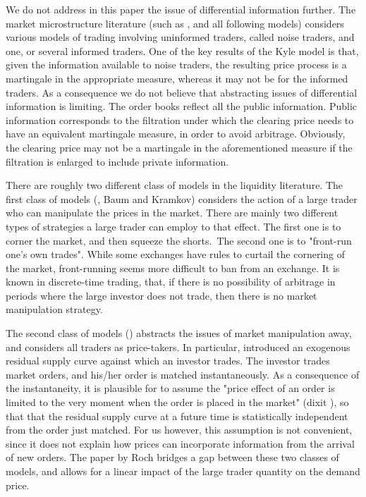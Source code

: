 \documentclass{article}
\begin{document}
We do not address in this paper the issue of differential information
further. The market microstructure literature (such as \cite{Kyl85}, and all
following models) considers various models of trading involving uninformed
traders, called noise traders, and one, or several informed traders. One of
the key results of the Kyle model is that, given the information available
to noise traders, the resulting price process is a martingale in the
appropriate measure, whereas it may not be for the informed traders. As a
consequence we do not believe that abstracting issues of differential
information is limiting. The order books reflect all the public information.
Public information corresponds to the filtration under which the clearing
price needs to have an equivalent martingale measure, in order to avoid
arbitrage. Obviously, the clearing price may not be a martingale in the
aforementioned measure if the filtration is enlarged to include private
information.

There are roughly two different class of models in the liquidity literature.
The first class of models (\cite{Jar92, Jar94, PS98a, PS98b, Fre98, SW00,
BB04, RS10}, Baum and Kramkov) considers the action of a large trader who
can manipulate the prices in the market. There are mainly two different
types of strategies a large trader can employ to that effect. The first one
is to corner the market, and then squeeze the shorts.\ The second one is to
"front-run one's own trades". While some exchanges have rules to curtail the
cornering of the market, front-running seems more difficult to ban from an
exchange. It is known in discrete-time trading, that, if there is no
possibility of arbitrage in periods where the large investor does not trade,
then there is no market manipulation strategy.

The second class of models (\cite{CJP04, CR07, CST10,GS11}) abstracts the
issues of market manipulation away, and considers all traders as
price-takers. In particular, \cite{CJP04} introduced an exogenous residual
supply curve against which an investor trades. The investor trades market
orders, and his/her order is matched instantaneously. As a consequence of
the instantaneity, it is plausible for \cite{CJP04} to assume the "price
effect of an order is limited to the very moment when the order is placed in
the market" (dixit \cite{BB04}), so that that the residual supply curve at a
future time is statistically independent from the order just matched. For us
however, this assumption is not convenient, since it does not explain how
prices can incorporate information from the arrival of new orders. The paper
by Roch bridges a gap between these two classes of models, and allows for a
linear impact of the large trader quantity on the demand price.
\end{document}
